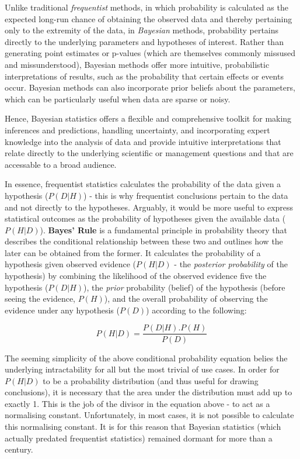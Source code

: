 \documentclass[
  8pt,
  a4paper]{article}
\begin{document}
\begin{tcolorbox}
Unlike traditional \emph{frequentist} methods, in which probability is
calculated as the expected long-run chance of obtaining the observed
data and thereby pertaining only to the extremity of the data, in
\emph{Bayesian} methods, probability pertains directly to the underlying
parameters and hypotheses of interest. Rather than generating point
estimates or p-values (which are themselves commonly missused and
missunderstood), Bayesian methods offer more intuitive, probabilistic
interpretations of results, such as the probability that certain effects
or events occur. Bayesian methods can also incorporate prior beliefs
about the parameters, which can be particularly useful when data are
sparse or noisy.

Hence, Bayesian statistics offers a flexible and comprehensive toolkit
for making inferences and predictions, handling uncertainty, and
incorporating expert knowledge into the analysis of data and provide
intuitive interpretations that relate directly to the underlying
scientific or management questions and that are accessable to a broad
audience.

In essence, frequentist statistics calculates the probability of the
data given a hypothesis (\(P(D|H)\)) - this is why frequentist
conclusions pertain to the data and not directly to the hypotheses.
Arguably, it would be more useful to express statistical outcomes as the
probability of hypotheses given the available data (\(P(H|D)\)).
\textbf{Bayes' Rule} is a fundamental principle in probability theory
that describes the conditional relationship between these two and
outlines how the later can be obtained from the former. It calculates
the probability of a hypothesis given observed evidence (\(P(H|D)\) -
the \emph{posterior probability} of the hypothesis) by combining the
likelihood of the observed evidence five the hypothesis (\(P(D|H)\)),
the \emph{prior} probability (belief) of the hypothesis (before seeing
the evidence, \(P(H)\)), and the overall probability of observing the
evidence under any hypothesis (\(P(D)\)) according to the following:

\[
P(H|D) = \frac{P(D|H).P(H)}{P(D)}
\]

The seeming simplicity of the above conditional probability equation
belies the underlying intractability for all but the most trivial of use
cases. In order for \(P(H|D)\) to be a probability distribution (and
thus useful for drawing conclusions), it is necessary that the area
under the distribution must add up to exactly 1. This is the job of the
divisor in the equation above - to act as a normalising constant.
Unfortunately, in most cases, it is not possible to calculate this
normalising constant. It is for this reason that Bayesian statistics
(which actually predated frequentist statistics) remained dormant for
more than a century.


\end{tcolorbox}
\end{document}
